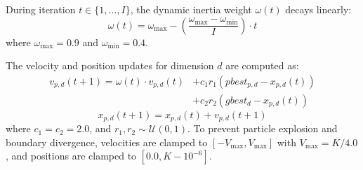 \documentclass[journal]{IEEEtran}
\begin{document}
During iteration $t \in \{1, \dots, I\}$, the dynamic inertia weight $\omega(t)$ decays linearly:
\begin{equation}
\omega(t) = \omega_{\text{max}} - \left( \frac{\omega_{\text{max}} - \omega_{\text{min}}}{I} \right) \cdot t
\label{eq:inertia}
\end{equation}
where $\omega_{\text{max}} = 0.9$ and $\omega_{\text{min}} = 0.4$.

The velocity and position updates for dimension $d$ are computed as:
\begin{equation}
\begin{aligned}
v_{p,d}(t+1) = \omega(t) \cdot v_{p,d}(t) &+ c_1 r_1 \left( pbest_{p,d} - x_{p,d}(t) \right) \\
&+ c_2 r_2 \left( gbest_d - x_{p,d}(t) \right)
\end{aligned}
\label{eq:pso_vel}
\end{equation}
\begin{equation}
x_{p,d}(t+1) = x_{p,d}(t) + v_{p,d}(t+1)
\label{eq:pso_pos}
\end{equation}
where $c_1 = c_2 = 2.0$, and $r_1, r_2 \sim \mathcal{U}(0, 1)$. To prevent particle explosion and boundary divergence, velocities are clamped to $[-V_{\text{max}}, V_{\text{max}}]$ with $V_{\text{max}} = K / 4.0$, and positions are clamped to $[0.0, K - 10^{-6}]$.
\end{document}
